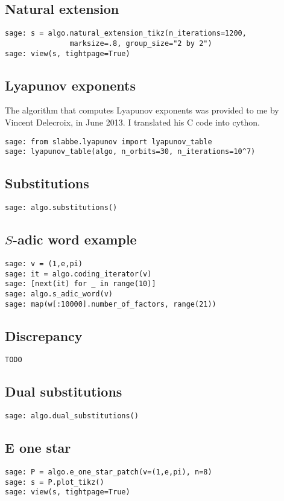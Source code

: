 \subsection{Natural extension}
\begin{verbatim}
sage: s = algo.natural_extension_tikz(n_iterations=1200, 
               marksize=.8, group_size="2 by 2")
sage: view(s, tightpage=True)
\end{verbatim}
\subsection{Lyapunov exponents}
The algorithm that computes Lyapunov exponents was provided to me
by Vincent Delecroix, in June 2013. I translated his C code into cython.
\begin{verbatim}
sage: from slabbe.lyapunov import lyapunov_table
sage: lyapunov_table(algo, n_orbits=30, n_iterations=10^7)
\end{verbatim}
\subsection{Substitutions}
\begin{verbatim}
sage: algo.substitutions()
\end{verbatim}
\subsection{$S$-adic word example}
\begin{verbatim}
sage: v = (1,e,pi)
sage: it = algo.coding_iterator(v)
sage: [next(it) for _ in range(10)]
sage: algo.s_adic_word(v)
sage: map(w[:10000].number_of_factors, range(21))  
\end{verbatim}
\subsection{Discrepancy}
\begin{verbatim}
TODO
\end{verbatim}
\subsection{Dual substitutions}
\begin{verbatim}
sage: algo.dual_substitutions()
\end{verbatim}
\subsection{E one star}
\begin{verbatim}
sage: P = algo.e_one_star_patch(v=(1,e,pi), n=8)
sage: s = P.plot_tikz()
sage: view(s, tightpage=True)
\end{verbatim}
